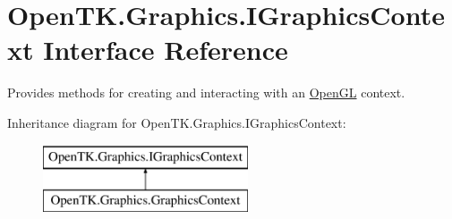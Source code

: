 \hypertarget{interface_open_t_k_1_1_graphics_1_1_i_graphics_context}{\section{Open\-T\-K.\-Graphics.\-I\-Graphics\-Context Interface Reference}
\label{interface_open_t_k_1_1_graphics_1_1_i_graphics_context}
}


Provides methods for creating and interacting with an \hyperlink{namespace_open_t_k_1_1_graphics_1_1_open_g_l}{Open\-G\-L} context.  


Inheritance diagram for Open\-T\-K.\-Graphics.\-I\-Graphics\-Context\-:\begin{figure}[H]
\begin{center}
\leavevmode
\includegraphics[height=2.000000cm]{interface_open_t_k_1_1_graphics_1_1_i_graphics_context}
\end{center}
\end{figure}
